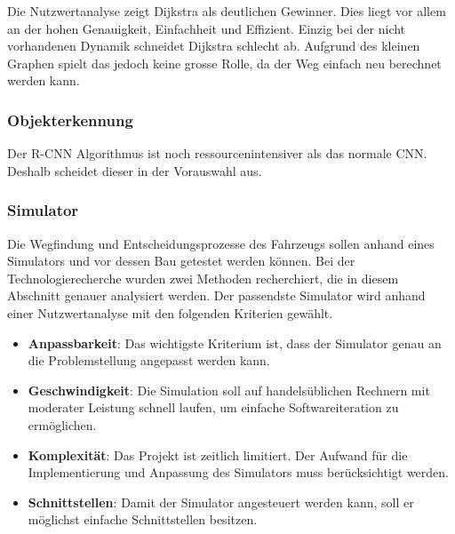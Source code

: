 \documentclass[../main.tex]{subfiles}
\begin{document}
Die Nutzwertanalyse zeigt Dijkstra als deutlichen Gewinner. Dies liegt vor allem an der hohen Genauigkeit, Einfachheit und Effizient. Einzig bei der nicht vorhandenen Dynamik schneidet Dijkstra schlecht ab. Aufgrund des kleinen Graphen spielt das jedoch keine grosse Rolle, da der Weg einfach neu berechnet werden kann.


\newpage
\subsubsection{Objekterkennung}

Der R-CNN Algorithmus ist noch ressourcenintensiver als das normale CNN. Deshalb scheidet dieser in der Vorauswahl aus.


\subsubsection{Simulator}
Die Wegfindung und Entscheidungsprozesse des Fahrzeugs sollen anhand eines Simulators und vor dessen Bau getestet werden können. Bei der Technologierecherche wurden zwei Methoden recherchiert, die in diesem Abschnitt genauer analysiert werden.
Der passendste Simulator wird anhand einer Nutzwertanalyse mit den folgenden Kriterien gewählt.

\begin{itemize}
\item \textbf{Anpassbarkeit}: Das wichtigste Kriterium ist, dass der Simulator genau an die Problemstellung angepasst werden kann.
\item \textbf{Geschwindigkeit}: Die Simulation soll auf handelsüblichen Rechnern mit moderater Leistung schnell laufen, um einfache Softwareiteration zu ermöglichen.  
\item \textbf{Komplexität}: Das Projekt ist zeitlich limitiert. Der Aufwand für die Implementierung und Anpassung des Simulators muss berücksichtigt werden.
\item \textbf{Schnittstellen}: Damit der Simulator angesteuert werden kann, soll er möglichst einfache Schnittstellen besitzen.
\end{itemize}
\end{document}
